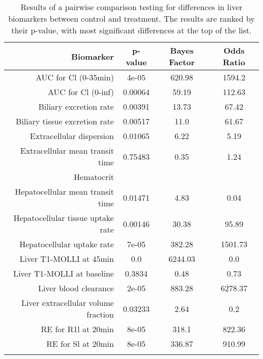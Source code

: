 \documentclass{epflreport}%
\begin{document}
%
\begin{longtable}{rccc}%
\hline%
Biomarker&p{-}value&Bayes Factor&Odds Ratio\\%
\hline%
AUC for Cl (0{-}35min)&4e{-}05&620.98&1594.2\\%
AUC for Cl (0{-}inf)&0.00064&59.19&112.63\\%
Biliary excretion rate&0.00391&13.73&67.42\\%
Biliary tissue excretion rate&0.00517&11.0&61.67\\%
Extracellular dispersion&0.01065&6.22&5.19\\%
Extracellular mean transit time&0.75483&0.35&1.24\\%
Hematocrit&&&\\%
Hepatocellular mean transit time&0.01471&4.83&0.04\\%
Hepatocellular tissue uptake rate&0.00146&30.38&95.89\\%
Hepatocellular uptake rate&7e{-}05&382.28&1501.73\\%
Liver T1{-}MOLLI at 45min&0.0&6244.03&0.0\\%
Liver T1{-}MOLLI at baseline&0.3834&0.48&0.73\\%
Liver blood clearance&2e{-}05&883.28&6278.37\\%
Liver extracellular volume fraction&0.03233&2.64&0.2\\%
RE for R1l at 20min&8e{-}05&318.1&822.36\\%
RE for Sl at 20min&8e{-}05&336.87&910.99\\%
\hline%
\caption{Results of a pairwise comparison testing for differences in liver biomarkers between control and treatment. The results are ranked by their p-value, with most significant differences at the top of the list.} \\%
\end{longtable}%
\end{document}
